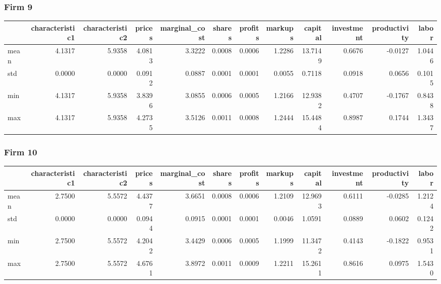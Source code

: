  \subsubsection*{Firm 9}
\begin{tabular}{lrrrrrrrrrrr}
\toprule
{} &  characteristic1 &  characteristic2 &  prices &  marginal\_cost &  shares &  profits &  markups &  capital &  investment &  productivity &  labor \\
\midrule
mean &           4.1317 &           5.9358 &  4.0813 &         3.3222 &  0.0008 &   0.0006 &   1.2286 &  13.7149 &      0.6676 &       -0.0127 & 1.0446 \\
std  &           0.0000 &           0.0000 &  0.0912 &         0.0887 &  0.0001 &   0.0001 &   0.0055 &   0.7118 &      0.0918 &        0.0656 & 0.1015 \\
min  &           4.1317 &           5.9358 &  3.8396 &         3.0855 &  0.0006 &   0.0005 &   1.2166 &  12.9382 &      0.4707 &       -0.1767 & 0.8438 \\
max  &           4.1317 &           5.9358 &  4.2735 &         3.5126 &  0.0011 &   0.0008 &   1.2444 &  15.4484 &      0.8987 &        0.1744 & 1.3437 \\
\bottomrule
\end{tabular}


 \subsubsection*{Firm 10}
\begin{tabular}{lrrrrrrrrrrr}
\toprule
{} &  characteristic1 &  characteristic2 &  prices &  marginal\_cost &  shares &  profits &  markups &  capital &  investment &  productivity &  labor \\
\midrule
mean &           2.7500 &           5.5572 &  4.4377 &         3.6651 &  0.0008 &   0.0006 &   1.2109 &  12.9693 &      0.6111 &       -0.0285 & 1.2124 \\
std  &           0.0000 &           0.0000 &  0.0944 &         0.0915 &  0.0001 &   0.0001 &   0.0046 &   1.0591 &      0.0889 &        0.0602 & 0.1242 \\
min  &           2.7500 &           5.5572 &  4.2042 &         3.4429 &  0.0006 &   0.0005 &   1.1999 &  11.3472 &      0.4143 &       -0.1822 & 0.9531 \\
max  &           2.7500 &           5.5572 &  4.6761 &         3.8972 &  0.0011 &   0.0009 &   1.2211 &  15.2611 &      0.8616 &        0.0975 & 1.5430 \\
\bottomrule
\end{tabular}


